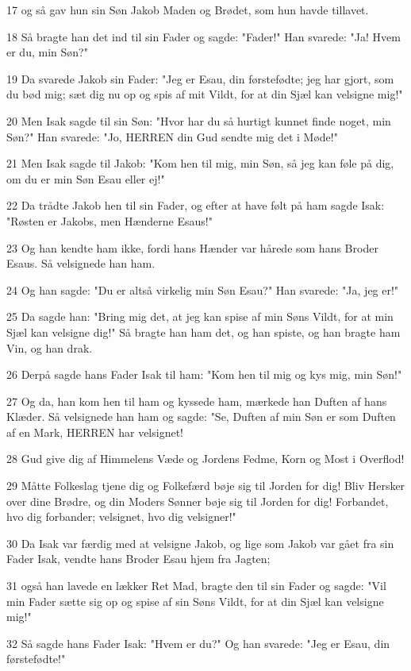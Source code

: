 \par 17 og så gav hun sin Søn Jakob Maden og Brødet, som hun havde tillavet.
\par 18 Så bragte han det ind til sin Fader og sagde: "Fader!" Han svarede: "Ja! Hvem er du, min Søn?"
\par 19 Da svarede Jakob sin Fader: "Jeg er Esau, din førstefødte; jeg har gjort, som du bød mig; sæt dig nu op og spis af mit Vildt, for at din Sjæl kan velsigne mig!"
\par 20 Men Isak sagde til sin Søn: "Hvor har du så hurtigt kunnet finde noget, min Søn?" Han svarede: "Jo, HERREN din Gud sendte mig det i Møde!"
\par 21 Men Isak sagde til Jakob: "Kom hen til mig, min Søn, så jeg kan føle på dig, om du er min Søn Esau eller ej!"
\par 22 Da trådte Jakob hen til sin Fader, og efter at have følt på ham sagde Isak: "Røsten er Jakobs, men Hænderne Esaus!"
\par 23 Og han kendte ham ikke, fordi hans Hænder var hårede som hans Broder Esaus. Så velsignede han ham.
\par 24 Og han sagde: "Du er altså virkelig min Søn Esau?" Han svarede: "Ja, jeg er!"
\par 25 Da sagde han: "Bring mig det, at jeg kan spise af min Søns Vildt, for at min Sjæl kan velsigne dig!" Så bragte han ham det, og han spiste, og han bragte ham Vin, og han drak.
\par 26 Derpå sagde hans Fader Isak til ham: "Kom hen til mig og kys mig, min Søn!"
\par 27 Og da, han kom hen til ham og kyssede ham, mærkede han Duften af hans Klæder. Så velsignede han ham og sagde: "Se, Duften af min Søn er som Duften af en Mark, HERREN har velsignet!
\par 28 Gud give dig af Himmelens Væde og Jordens Fedme, Korn og Most i Overflod!
\par 29 Måtte Folkeslag tjene dig og Folkefærd bøje sig til Jorden for dig! Bliv Hersker over dine Brødre, og din Moders Sønner bøje sig til Jorden for dig! Forbandet, hvo dig forbander; velsignet, hvo dig velsigner!"
\par 30 Da Isak var færdig med at velsigne Jakob, og lige som Jakob var gået fra sin Fader Isak, vendte hans Broder Esau hjem fra Jagten;
\par 31 også han lavede en lækker Ret Mad, bragte den til sin Fader og sagde: "Vil min Fader sætte sig op og spise af sin Søns Vildt, for at din Sjæl kan velsigne mig!"
\par 32 Så sagde hans Fader Isak: "Hvem er du?" Og han svarede: "Jeg er Esau, din førstefødte!"
